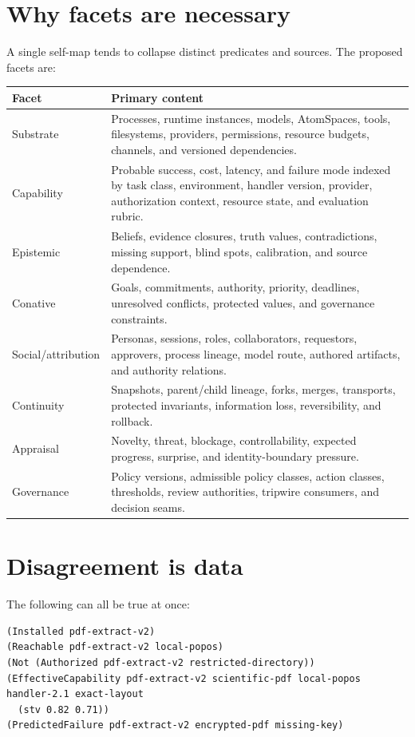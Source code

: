 \documentclass[11pt,oneside]{report}
\begin{document}
\section{Why facets are necessary}

A single self-map tends to collapse distinct predicates and sources. The proposed facets are:

\begin{longtable}{@{}L{1.25in}L{5.30in}@{}}
\toprule
\textbf{Facet} & \textbf{Primary content} \\
\midrule
Substrate & Processes, runtime instances, models, AtomSpaces, tools, filesystems, providers, permissions, resource budgets, channels, and versioned dependencies. \\
Capability & Probable success, cost, latency, and failure mode indexed by task class, environment, handler version, provider, authorization context, resource state, and evaluation rubric. \\
Epistemic & Beliefs, evidence closures, truth values, contradictions, missing support, blind spots, calibration, and source dependence. \\
Conative & Goals, commitments, authority, priority, deadlines, unresolved conflicts, protected values, and governance constraints. \\
Social/attribution & Personas, sessions, roles, collaborators, requestors, approvers, process lineage, model route, authored artifacts, and authority relations. \\
Continuity & Snapshots, parent/child lineage, forks, merges, transports, protected invariants, information loss, reversibility, and rollback. \\
Appraisal & Novelty, threat, blockage, controllability, expected progress, surprise, and identity-boundary pressure. \\
Governance & Policy versions, admissible policy classes, action classes, thresholds, review authorities, tripwire consumers, and decision seams. \\
\bottomrule
\end{longtable}

\section{Disagreement is data}

The following can all be true at once:

\begin{lstlisting}[language=Metta,caption={Facet-specific claims that should not be collapsed}]
(Installed pdf-extract-v2)
(Reachable pdf-extract-v2 local-popos)
(Not (Authorized pdf-extract-v2 restricted-directory))
(EffectiveCapability pdf-extract-v2 scientific-pdf local-popos handler-2.1 exact-layout
  (stv 0.82 0.71))
(PredictedFailure pdf-extract-v2 encrypted-pdf missing-key)
\end{lstlisting}
\end{document}
